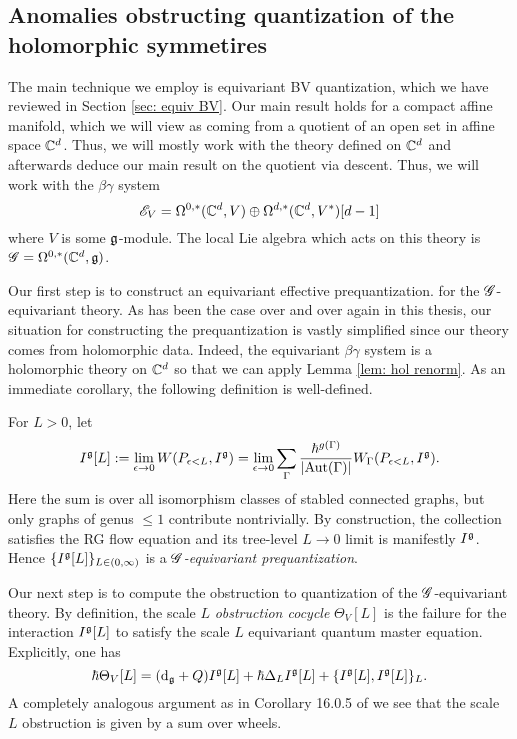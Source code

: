 \documentclass[10pt]{amsart}
\begin{document}
\subsection{Anomalies obstructing quantization of the holomorphic symmetires}

The main technique we employ is equivariant BV quantization, which we have reviewed in Section \ref{sec: equiv BV}. 
Our main result holds for a compact affine manifold, which we will view as coming from a quotient of an open set in affine space $\mathbb C^d$. 
Thus, we will mostly work with the theory defined on $\mathbb C^d$ and afterwards deduce our main result on the quotient via descent.
Thus, we will work with the $\beta\gamma$ system
\[
\mathscr E_V = \Omega^{0,*}(\mathbb C^d, V) \oplus \Omega^{d,*}(\mathbb C^d, V^*)[d-1]
\]
where $V$ is some $\mathfrak g$-module.
The local Lie algebra which acts on this theory is $\mathscr G = \Omega^{0,*}(\mathbb C^d , \mathfrak g)$. 

Our first step is to construct an equivariant effective prequantization.
for the $\mathscr G$-equivariant theory.
As has been the case over and over again in this thesis, our situation for constructing the prequantization is vastly simplified since our theory comes from holomorphic data. 
Indeed, the equivariant $\beta\gamma$ system is a holomorphic theory on $\mathbb C^d$ so that we can apply Lemma \ref{lem: hol renorm}.
As an immediate corollary, the following definition is well-defined. 

\begin{dfn}
For $L > 0$, let
\[
I^{\rm \mathfrak g}[L] := \lim_{\epsilon \to 0} W(P_{\epsilon < L}, I^{\rm \mathfrak g}) 
= \lim_{\epsilon \to 0} \sum_{\Gamma } \frac{\hbar^{g(\Gamma)}}{|{\rm Aut}(\Gamma)|} W_\Gamma(P_{\epsilon<L}, I^{\mathfrak g}) . 
\] 
Here the sum is over all isomorphism classes of stabled connected graphs, but only graphs of genus $\leq 1$ contribute nontrivially. 
By construction, the collection satisfies the RG flow equation and its tree-level $L \to 0$ limit is manifestly $I^{\mathfrak g}$.
Hence $\{I^{\rm \mathfrak g}[L]\}_{L \in (0,\infty)}$ is a \emph{$\mathscr G$-equivariant prequantization}.
\end{dfn}

Our next step is to compute the obstruction to quantization of the $\mathscr G$-equivariant theory.
By definition, the scale $L$ {\em obstruction cocycle} $\Theta_{V}[L]$ is 
the failure for the interaction $I^{\rm \mathfrak g}[L]$ to satisfy the scale $L$ equivariant quantum master equation. 
Explicitly, one has
\[
\hbar \Theta_V [L] = ({\rm d}_{\mathfrak g} + Q)I^{\mathfrak g}[L] + \hbar \Delta_L I^{\rm \mathfrak g}[L] + \{I^{\mathfrak g}[L], I^{\mathfrak g}[L]\}_L.
\]
A completely analogous argument as in Corollary 16.0.5 of \cite{WG2} we see that the scale $L$ obstruction is given by a sum over wheels. 
\end{document}
